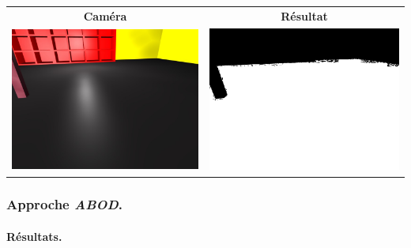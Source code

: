 \begin{frame}
\begin{center}
{\begin{tabular}{cc}
            \end{tabular}
        }  {
            \begin{tabular}{cc}
                \textbf{Caméra} & \textbf{Résultat} \\
                \includegraphics[width=0.4\linewidth]{rcs/abodv2s.png} & \includegraphics[width=0.4\linewidth]{rcs/abodv2r.png} \\
            \end{tabular}
        }
    \end{center}
\end{frame}

\begin{frame}
    \frametitle{Approche \emph{ABOD}.}
    \framesubtitle{Résultats.}
\end{frame}

